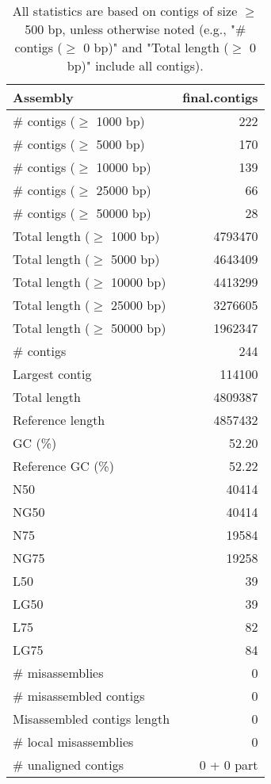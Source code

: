\documentclass[12pt,a4paper]{article}
\begin{document}
\begin{table}[ht]
\begin{center}
\caption{All statistics are based on contigs of size $\geq$ 500 bp, unless otherwise noted (e.g., "\# contigs ($\geq$ 0 bp)" and "Total length ($\geq$ 0 bp)" include all contigs).}
\begin{tabular}{|l*{1}{|r}|}
\hline
Assembly & final.contigs \\ \hline
\# contigs ($\geq$ 1000 bp) & 222 \\ \hline
\# contigs ($\geq$ 5000 bp) & 170 \\ \hline
\# contigs ($\geq$ 10000 bp) & 139 \\ \hline
\# contigs ($\geq$ 25000 bp) & 66 \\ \hline
\# contigs ($\geq$ 50000 bp) & 28 \\ \hline
Total length ($\geq$ 1000 bp) & 4793470 \\ \hline
Total length ($\geq$ 5000 bp) & 4643409 \\ \hline
Total length ($\geq$ 10000 bp) & 4413299 \\ \hline
Total length ($\geq$ 25000 bp) & 3276605 \\ \hline
Total length ($\geq$ 50000 bp) & 1962347 \\ \hline
\# contigs & 244 \\ \hline
Largest contig & 114100 \\ \hline
Total length & 4809387 \\ \hline
Reference length & 4857432 \\ \hline
GC (\%) & 52.20 \\ \hline
Reference GC (\%) & 52.22 \\ \hline
N50 & 40414 \\ \hline
NG50 & 40414 \\ \hline
N75 & 19584 \\ \hline
NG75 & 19258 \\ \hline
L50 & 39 \\ \hline
LG50 & 39 \\ \hline
L75 & 82 \\ \hline
LG75 & 84 \\ \hline
\# misassemblies & 0 \\ \hline
\# misassembled contigs & 0 \\ \hline
Misassembled contigs length & 0 \\ \hline
\# local misassemblies & 0 \\ \hline
\# unaligned contigs & 0 + 0 part \\ \hline

\end{tabular}
\end{center}
\end{table}
\end{document}
